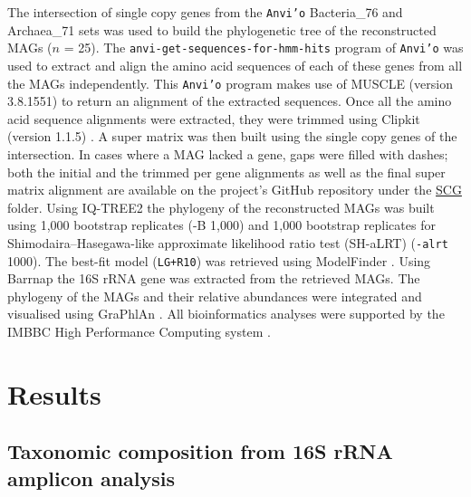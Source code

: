    The intersection of single copy genes from the \texttt{Anvi’o} \citep{eren_anvio_2015} Bacteria\_76 and Archaea\_71 sets was used to build the phylogenetic tree of the reconstructed MAGs ($n$ = 25). 
   The \texttt{anvi-get-sequences-for-hmm-hits} program of \texttt{Anvi’o} was used to extract and align the amino acid sequences of each of these genes from all the MAGs independently. 
   This \texttt{Anvi’o} program makes use of MUSCLE (version 3.8.1551) \citep{edgar_muscle_2004} to return an alignment of the extracted sequences. 
   Once all the amino acid sequence alignments were extracted, they were trimmed using Clipkit (version 1.1.5) \citep{steenwyk_clipkit_2020}. 
   A super matrix was then built using the single copy genes of the intersection. 
   In cases where a MAG lacked a gene, gaps were filled with dashes; both the initial and the trimmed per gene alignments as well as the final super matrix alignment are available on the project’s GitHub repository 
   under the \href{https://github.com/hariszaf/karpathos-swamp/tree/main/phylogeny/SCG/}{SCG} folder. 
   Using IQ-TREE2 \citep{hoang_ufboot2_2018, minh_iq-tree_2020} the phylogeny of the reconstructed MAGs was built using 1,000 bootstrap replicates (-B 1,000) and 1,000 bootstrap replicates for Shimodaira–Hasegawa-like 
   approximate likelihood ratio test (SH-aLRT) (\texttt{-alrt} 1000). 
   The best-fit model (\texttt{LG+R10}) was retrieved using ModelFinder \citep{kalyaanamoorthy_modelfinder_2017}. 
   Using Barrnap \citep{seemann_barrnap_2014} the 16S rRNA gene was extracted from the retrieved MAGs. 
   The phylogeny of the MAGs and their relative abundances were integrated and visualised using GraPhlAn \citep{asnicar_compact_2015}. 
   All bioinformatics analyses were supported by the IMBBC High Performance Computing system \citep{zafeiropoulos_imbbc_2021}.

\section{Results}
\label{swamp:results}


\subsection{Taxonomic composition from 16S rRNA amplicon analysis}

